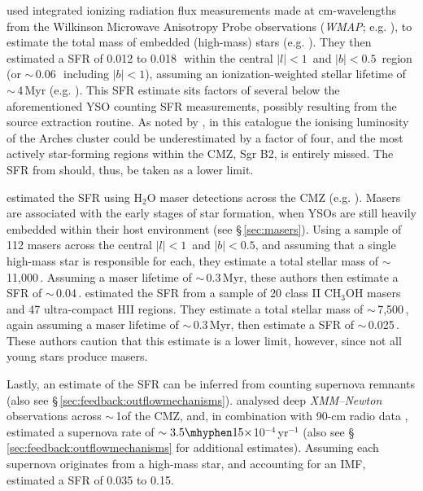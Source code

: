 \citet{Longmore2013b} used integrated ionizing radiation flux measurements made at cm-wavelengths from the Wilkinson Microwave Anisotropy Probe observations ({\em WMAP}; e.g. \citealp{Lee2012}), to estimate the total mass of embedded (high-mass) stars (e.g. \citealp{Murray2010}).
They then estimated a SFR of 0.012 to 0.018\,\msunyr \ within the central $|l|<1$\degree\ and $|b|<0.5$\degree\ region (or $\sim$\,0.06\,\msunyr \ including $|b|<1$\degree), assuming an ionization-weighted stellar lifetime of $\sim$\,4\,Myr (e.g. \citealp{Murray2010}). 
This SFR estimate sits factors of several below the aforementioned YSO counting SFR measurements, possibly resulting from the \citealp{Lee2012} source extraction routine. 
As noted by \citealp{Lee2012}, in this catalogue the ionising luminosity of the Arches cluster could be underestimated by a factor of four, and the most actively star-forming regions within the CMZ, Sgr B2, is entirely missed.
The SFR from \citet{Longmore2013b} should, thus, be taken as a lower limit.

\citet{Lu2019b} estimated the SFR using H$_2$O maser detections across the CMZ (e.g. \citealp{Walsh2011}). 
Masers are associated with the early stages of star formation, when YSOs are still heavily embedded within their host environment (see \S\,\ref{sec:masers}). Using a sample of 112 masers across the central $|l|<1$\degree\ and $|b|<0.5$\degree, and assuming that a single high-mass star is responsible for each, they estimate a total stellar mass of $\sim$\,11,000\,\msun. 
Assuming a maser lifetime of $\sim$\,0.3\,Myr, these authors then estimate a SFR of $\sim$\,0.04\,\msunyr. 
\citet{Lu2019a} estimated the SFR from a sample of 20 class II CH$_3$OH masers and 47 ultra-compact HII regions. They estimate a total stellar mass of $\sim$\,7,500\,\msun, again assuming a maser lifetime of $\sim$\,0.3\,Myr, then estimate a SFR of $\sim$\,0.025\,\msunyr. These authors caution that this estimate is a lower limit, however, since not all young stars produce masers.


Lastly, an estimate of the SFR can be inferred from counting supernova remnants (also see \S\,\ref{sec:feedback:outflowmechanisms}). 
\cite{Ponti2015} analysed deep {\it XMM–Newton} observations across $\sim$\,1\degree of the CMZ, and, in combination with 90-cm radio data \citep{LaRosa2000}, estimated a supernova rate of $\sim3.5\mhyphen15\times$10$^{-4}$\,yr$^{-1}$ (also see \S\,\ref{sec:feedback:outflowmechanisms} for additional estimates).
Assuming each supernova originates from a high-mass star, and accounting for an IMF, \cite{Ponti2015} estimated a SFR of 0.035 to 0.15\msunyr.

